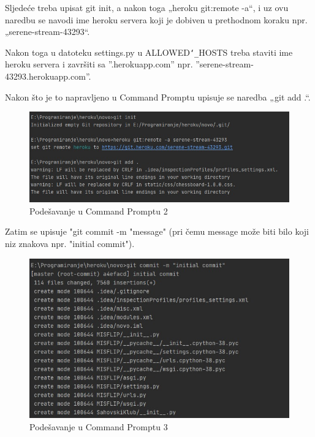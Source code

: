 			\noindent Sljedeće treba upisat git init, a nakon toga „heroku git:remote -a“, i uz ovu naredbu se navodi ime heroku servera koji je dobiven u prethodnom koraku npr. „serene-stream-43293“.
			
			\noindent Nakon toga u datoteku settings.py u ALLOWED\texttt{\char`_}HOSTS treba staviti ime heroku servera i završiti sa ''.herokuapp.com'' npr. ''serene-stream-43293.herokuapp.com''. 
			
			\noindent Nakon što je to napravljeno u Command Promptu upisuje se naredba „git add .“.
			
			\begin{figure}[H]
				\centerfloat
				\includegraphics[scale=0.4]{slike/pustanjeupogon2.jpeg} %
				\caption{Podešavanje u Command Promptu 2}
				
			\end{figure}
			
			\eject
			
			\noindent Zatim se upisuje "git commit -m "message" (pri čemu message može biti bilo koji niz znakova npr. "initial commit").
			
			\begin{figure}[H]
				\centerfloat
				\includegraphics[scale=0.4]{slike/pustanjeupogon3.jpeg} %
				\caption{Podešavanje u Command Promptu 3}
				
			\end{figure}
			
